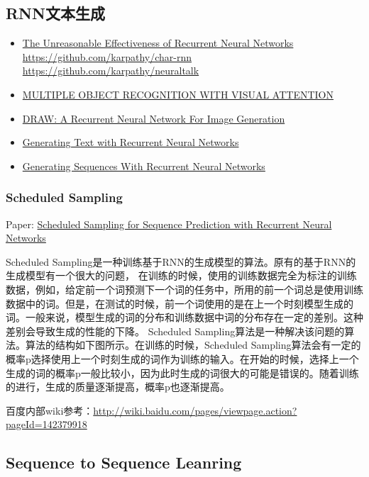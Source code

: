 \documentclass[UTF8,11pt,a4paper]{ctexart}
\begin{document}
\subsection{RNN文本生成}
\begin{itemize}
\item \href{http://karpathy.github.io/2015/05/21/rnn-effectiveness/}{The Unreasonable Effectiveness of Recurrent Neural Networks}
\subitem \url{https://github.com/karpathy/char-rnn}
\subitem \url{https://github.com/karpathy/neuraltalk}
\item \href{https://arxiv.org/abs/1412.7755}{MULTIPLE OBJECT RECOGNITION WITH VISUAL ATTENTION}
\item \href{https://arxiv.org/abs/1502.04623}{DRAW: A Recurrent Neural Network For Image Generation}
\item \href{http://www.cs.utoronto.ca/~ilya/pubs/2011/LANG-RNN.pdf}{Generating Text with Recurrent Neural Networks}
\item \href{https://arxiv.org/abs/1308.0850}{Generating Sequences With Recurrent Neural Networks}
\end{itemize}


\subsubsection{Scheduled Sampling}
Paper: \href{https://arxiv.org/pdf/1506.03099.pdf}{Scheduled Sampling for Sequence Prediction with Recurrent Neural Networks}

Scheduled Sampling是一种训练基于RNN的生成模型的算法。原有的基于RNN的生成模型有一个很大的问题， 在训练的时候，使用的训练数据完全为标注的训练数据，例如，给定前一个词预测下一个词的任务中，所用的前一个词总是使用训练数据中的词。但是，在测试的时候，前一个词使用的是在上一个时刻模型生成的词。一般来说，模型生成的词的分布和训练数据中词的分布存在一定的差别。这种差别会导致生成的性能的下降。
Scheduled Sampling算法是一种解决该问题的算法。算法的结构如下图所示。在训练的时候，Scheduled Sampling算法会有一定的概率p选择使用上一个时刻生成的词作为训练的输入。在开始的时候，选择上一个生成的词的概率p一般比较小，因为此时生成的词很大的可能是错误的。随着训练的进行，生成的质量逐渐提高，概率p也逐渐提高。

百度内部wiki参考：\url{http://wiki.baidu.com/pages/viewpage.action?pageId=142379918}


\subsection{Sequence to Sequence Leanring}
\end{document}
